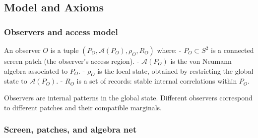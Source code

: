 \documentclass[11pt,a4paper]{article}
\theoremstyle{remark}
\begin{document}
\begin{abstract}
\textbf{Fundamental parameters.} The model reduces physics to two fundamental
parameters characterizing the holographic screen:

\begin{enumerate}
\def\labelenumi{\arabic{enumi}.}
\item
  \textbf{Pixel area}: \(a_\mathrm{cell} \approx 1.63\,\ell_P^2\), the geometric area
  of a single computational element. This sets the \emph{resolution} of reality
  (Newton's constant, gauge couplings, particle masses).
\item
  \textbf{Screen capacity}: \(\log(\dim\mathcal{H}_\mathrm{tot}) \sim 10^{122}\), the
  total degrees of freedom. This sets the \emph{size} of reality (cosmological
  constant, de Sitter horizon).
\end{enumerate}

Everything else (gauge groups, charge quantization, Einstein equations,
mass ratios) is derived structure. The axioms contain no other dimensionful
constants.
\end{abstract}



\subsection{Model and Axioms}\label{model-and-axioms}

\subsubsection{Observers and access model}\label{observers-and-access-model}

An observer \(O\) is a tuple \((P_O, \mathcal{A}(P_O), \rho_O, R_O)\) where:
- \(P_O \subset S^2\) is a connected screen patch (the observer's access region).
- \(\mathcal{A}(P_O)\) is the von Neumann algebra associated to \(P_O\).
- \(\rho_O\) is the local state, obtained by restricting the global state to \(\mathcal{A}(P_O)\).
- \(R_O\) is a set of records: stable internal correlations within \(P_O\).

Observers are internal patterns in the global state.
Different observers correspond to different patches and their compatible
marginals.

\subsubsection{Screen, patches, and algebra net}\label{screen-patches-and-algebra-net}
\end{document}
